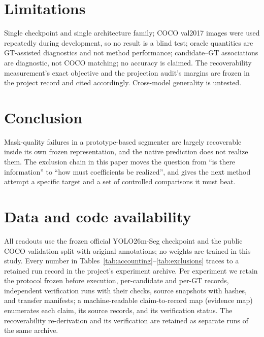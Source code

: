 ﻿\documentclass[times,twocolumn,final,authoryear]{elsarticle}
\begin{document}
\section{Limitations}
Single checkpoint and single architecture family; COCO val2017 images were used repeatedly during
development, so no result is a blind test; oracle quantities are GT-assisted diagnostics and not
method performance; candidate--GT associations are diagnostic, not COCO matching; no accuracy is
claimed. The recoverability measurement's exact objective and the projection audit's margins are
frozen in the project record and cited accordingly. Cross-model generality is untested.

\section{Conclusion}
Mask-quality failures in a prototype-based segmenter are largely recoverable inside its own frozen
representation, and the native prediction does not realize them. The exclusion chain in this paper
moves the question from ``is there information'' to ``how must coefficients be realized'', and
gives the next method attempt a specific target and a set of controlled comparisons it must beat.

\section*{{Data and code availability}}
All readouts use the frozen official YOLO26m-Seg checkpoint and the public COCO validation split
with original annotations; no weights are trained in this study. Every number in
Tables~\ref{tab:accounting}--\ref{tab:exclusions} traces to a retained run record in the project's
experiment archive. Per experiment we retain the protocol frozen before execution, per-candidate
and per-GT records, independent verification runs with their checks, source snapshots with hashes,
and transfer manifests; a machine-readable claim-to-record map (evidence map) enumerates each
claim, its source records, and its verification status. The recoverability re-derivation and its
verification are retained as separate runs of the same archive.



\end{document}
